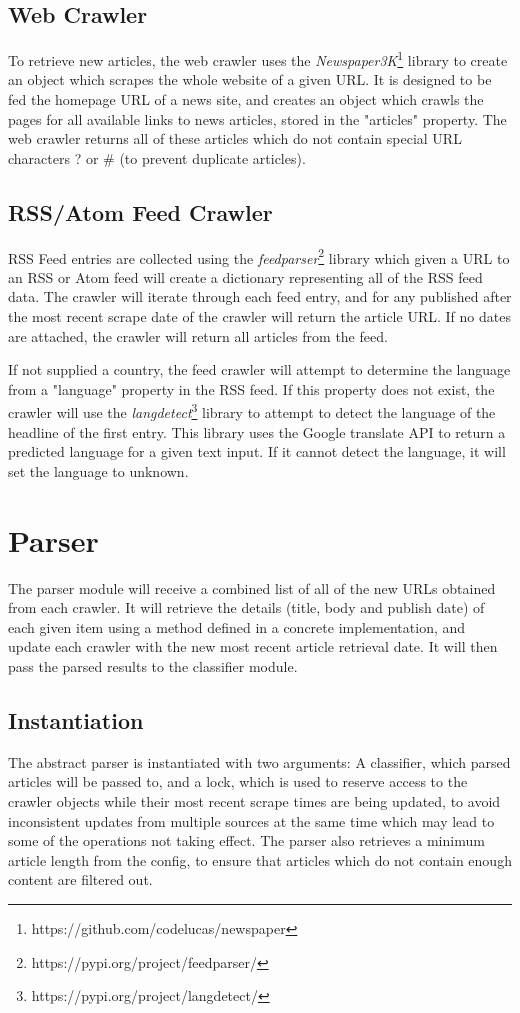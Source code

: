 \documentclass{l4proj}
\begin{document}
\subsection{Web Crawler}
To retrieve new articles, the web crawler uses the \emph{Newspaper3K}\footnote{https://github.com/codelucas/newspaper} library to create an object which scrapes the whole website of a given URL. It is designed to be fed the homepage URL of a news site, and creates an object which crawls the pages for all available links to news articles, stored in the "articles" property. The web crawler returns all of these articles which do not contain special URL characters ? or \# (to prevent duplicate articles).
\subsection{RSS/Atom Feed Crawler}
RSS Feed entries are collected using the \emph{feedparser}\footnote{https://pypi.org/project/feedparser/} library which given a URL to an RSS or Atom feed will create a dictionary representing all of the RSS feed data. The crawler will iterate through each feed entry, and for any published after the most recent scrape date of the crawler will return the article URL. If no dates are attached, the crawler will return all articles from the feed. \par
If not supplied a country, the feed crawler will attempt to determine the language from a "language" property in the RSS feed. If this property does not exist, the crawler will use the \emph{langdetect}\footnote{https://pypi.org/project/langdetect/} library to attempt to detect the language of the headline of the first entry. This library uses the Google translate API to return a predicted language for a given text input. If it cannot detect the language, it will set the language to unknown.


\section{Parser}
The parser module will receive a combined list of all of the new URLs obtained from each crawler. It will retrieve the details (title, body and publish date) of each given item using a method defined in a concrete implementation, and update each crawler with the new most recent article retrieval date. It will then pass the parsed results to the classifier module.
\subsection{Instantiation}
The abstract parser is instantiated with two arguments: A classifier, which parsed articles will be passed to, and a lock, which is used to reserve access to the crawler objects while their most recent scrape times are being updated, to avoid inconsistent updates from multiple sources at the same time which may lead to some of the operations not taking effect. The parser also retrieves a minimum article length from the config, to ensure that articles which do not contain enough content are filtered out.
\end{document}
